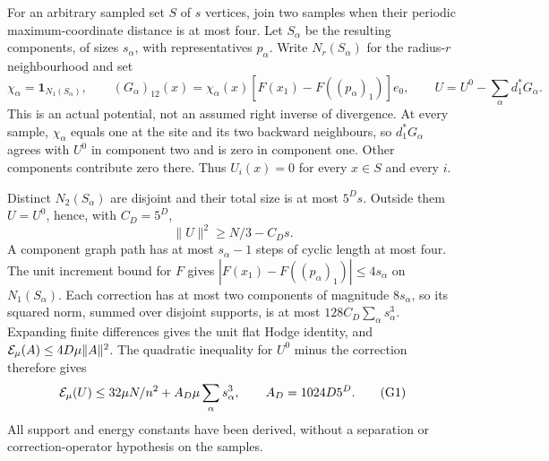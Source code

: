 For an arbitrary sampled set $S$ of $s$ vertices, join two samples when
their periodic maximum-coordinate distance is at most four. Let $S_\alpha$
be the resulting components, of sizes $s_\alpha$, with representatives
$p_\alpha$. Write $N_r(S_\alpha)$ for the radius-$r$ neighbourhood and set
\[
 \chi_\alpha=\mathbf1_{N_1(S_\alpha)},\qquad
 (G_\alpha)_{12}(x)=\chi_\alpha(x)
       [F(x_1)-F((p_\alpha)_1)]e_0,
 \qquad U=U^0-\sum_\alpha d_1^*G_\alpha.
\]
This is an actual potential, not an assumed right inverse of divergence.
At every sample, $\chi_\alpha$ equals one at the site and its two backward
neighbours, so $d_1^*G_\alpha$ agrees with $U^0$ in component two and is
zero in component one. Other components contribute zero there. Thus
$U_i(x)=0$ for every $x\in S$ and every $i$.

Distinct $N_2(S_\alpha)$ are disjoint and their total size is at most
$5^Ds$. Outside them $U=U^0$, hence, with $C_D=5^D$,
\[
 \|U\|^2\geq N/3-C_Ds.
\]
A component graph path has at most $s_\alpha-1$ steps of cyclic length
at most four. The unit increment bound for $F$ gives
$|F(x_1)-F((p_\alpha)_1)|\leq4s_\alpha$ on $N_1(S_\alpha)$.
Each correction has at most two components of magnitude $8s_\alpha$,
so its squared norm, summed over disjoint supports, is at most
$128C_D\sum_\alpha s_\alpha^3$. Expanding finite differences gives the
unit flat Hodge identity, and $\mathcal E_\mu(A)\leq4D\mu\|A\|^2$.
The quadratic inequality for $U^0$ minus the correction therefore gives
\[
 \mathcal E_\mu(U)\leq32\mu N/n^2+A_D\mu\sum_\alpha s_\alpha^3,
 \qquad A_D=1024D5^D.                                      \tag{G1}
\]
All support and energy constants have been derived, without a separation
or correction-operator hypothesis on the samples.

